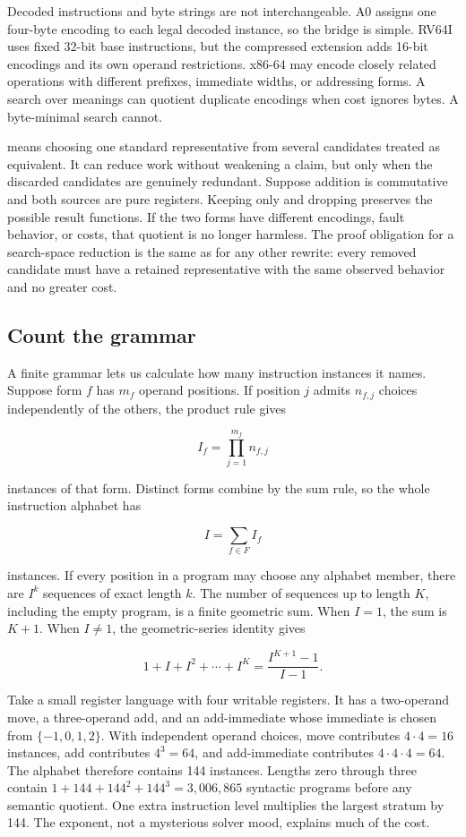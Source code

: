 Decoded instructions and byte strings are not interchangeable. A0 assigns
one four-byte encoding to each legal decoded instance, so the bridge is
simple. RV64I uses fixed 32-bit base instructions, but the compressed
extension adds 16-bit encodings and its own operand restrictions. x86-64 may
encode closely related operations with different prefixes, immediate widths,
or addressing forms. A search over meanings can quotient duplicate encodings
when cost ignores bytes. A byte-minimal search cannot.

 means choosing one standard representative from
several candidates treated as equivalent. It can reduce work without weakening
a claim, but only when the discarded candidates are genuinely redundant.
Suppose addition is
commutative and both sources are pure registers. Keeping only
 and dropping  preserves the possible
result functions. If the two forms have different encodings, fault behavior,
or costs, that quotient is no longer harmless. The proof obligation for a
search-space reduction is the same as for any other rewrite: every removed
candidate must have a retained representative with the same observed
behavior and no greater cost.

\subsection{Count the grammar}

A finite grammar lets us calculate how many instruction instances it names.
Suppose form \(f\) has \(m_f\) operand positions. If position \(j\) admits
\(n_{f,j}\) choices independently of the others, the product rule gives

\[
  I_f=\prod_{j=1}^{m_f} n_{f,j}
\]

instances of that form. Distinct forms combine by the sum rule, so the whole
instruction alphabet has

\[
  I=\sum_{f\in F} I_f
\]

instances. If every position in a program may choose any alphabet member,
there are \(I^k\) sequences of exact length \(k\). The number of sequences up
to length \(K\), including the empty program, is a finite geometric sum.
When \(I=1\), the sum is \(K+1\). When \(I\ne1\), the geometric-series
identity gives

\[
  1+I+I^2+\cdots+I^K=\frac{I^{K+1}-1}{I-1}.
\]

Take a small register language with four writable registers. It has a
two-operand move, a three-operand add, and an add-immediate whose immediate is
chosen from \(\{-1,0,1,2\}\). With independent operand choices, move contributes
\(4\cdot4=16\) instances, add contributes \(4^3=64\), and add-immediate
contributes \(4\cdot4\cdot4=64\). The alphabet therefore contains 144
instances. Lengths zero through three contain
\(1+144+144^2+144^3=3{,}006{,}865\) syntactic programs before any semantic
quotient. One extra instruction level multiplies the largest stratum by 144.
The exponent, not a mysterious solver mood, explains much of the cost.

